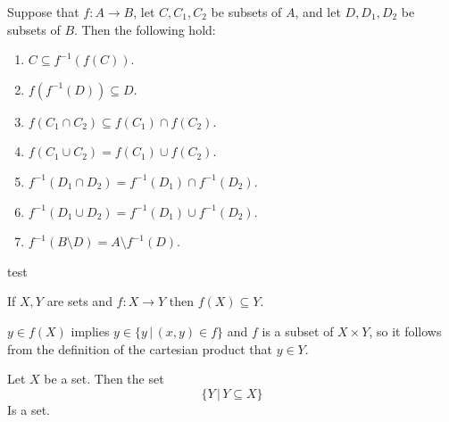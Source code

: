 \documentclass{article}
\begin{document}
\begin{theorem}
	Suppose that \(f:A\rightarrow B\), let \(C,C_1,C_2\) be subsets of \(A\), and let \(D,D_1,D_2\) be subsets of \(B\). Then the following hold:
	\begin{enumerate}
		\item \(C\subseteq f^{-1}(f(C))\).
		\item \(f(f^{-1}(D))\subseteq D\).
		\item \(f(C_1\cap C_2)\subseteq f(C_1)\cap f(C_2)\).
		\item \(f(C_1\cup C_2)=f(C_1)\cup f(C_2)\).
		\item \(f^{-1}(D_1\cap D_2)=f^{-1}(D_1)\cap f^{-1}(D_2)\).
		\item \(f^{-1}(D_1\cup D_2)=f^{-1}(D_1)\cup f^{-1}(D_2)\).
		\item \(f^{-1}(B\setminus D)=A\setminus f^{-1}(D)\).
	\end{enumerate}
	\begin{IEEEproof}
		test
	\end{IEEEproof}
\end{theorem}
\begin{proposition}
	\label{imagessubset}
	If \(X,Y\) are sets and \(f:X\rightarrow Y\) then \(f(X)\subseteq Y\).
\end{proposition}
\begin{IEEEproof}
	\(y\in f(X)\) implies \(y\in \{y\,|\,(x,y)\in f\}\) and \(f\) is a subset of \(X\times Y\), so it follows from the definition of the cartesian product that \(y\in Y\).
\end{IEEEproof}
\begin{lemma}
	Let \(X\) be a set. Then the set
	\begin{equation*}
		\{Y\,|\,Y\subseteq X\}
	\end{equation*}
	Is a set.
\end{lemma}
\end{document}
